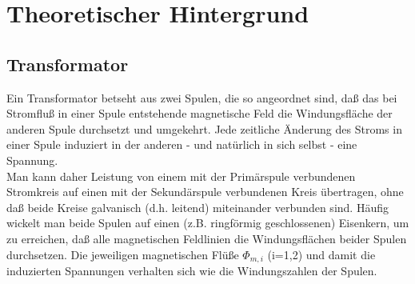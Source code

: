 \section{Theoretischer Hintergrund}


\subsection{Transformator}

Ein Transformator betseht aus zwei Spulen, die so angeordnet sind, daß das bei Stromfluß in einer Spule entstehende magnetische Feld die Windungsfläche der anderen Spule durchsetzt und umgekehrt. Jede zeitliche Änderung des Stroms in einer Spule induziert in der anderen - und natürlich in sich selbst - eine Spannung.\\
Man kann daher Leistung von einem mit der Primärspule verbundenen Stromkreis auf einen mit der Sekundärspule verbundenen Kreis übertragen, ohne daß beide Kreise galvanisch (d.h. leitend) miteinander verbunden sind. Häufig wickelt man beide Spulen auf einen (z.B. ringförmig geschlossenen) Eisenkern, um zu erreichen, daß alle magnetischen Feldlinien die Windungsflächen beider Spulen durchsetzen. Die jeweiligen magnetischen Flüße $\Phi_{m,i}$ (i=1,2) und damit die induzierten Spannungen verhalten sich wie die Windungszahlen der Spulen. \\


